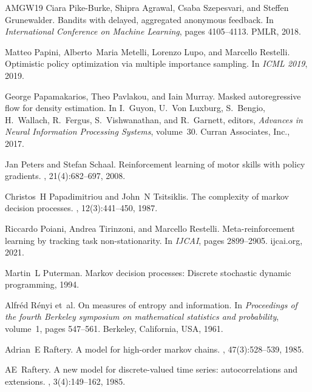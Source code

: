 \begin{thebibliography}{AMGW{\etalchar{+}}19}
Ciara Pike-Burke, Shipra Agrawal, Csaba Szepesvari, and Steffen Grunewalder.
\newblock Bandits with delayed, aggregated anonymous feedback.
\newblock In {\em International Conference on Machine Learning}, pages 4105--4113. PMLR, 2018.

Matteo Papini, Alberto~Maria Metelli, Lorenzo Lupo, and Marcello Restelli.
\newblock Optimistic policy optimization via multiple importance sampling.
\newblock In {\em ICML 2019}, 2019.

George Papamakarios, Theo Pavlakou, and Iain Murray.
\newblock Masked autoregressive flow for density estimation.
\newblock In I.~Guyon, U.~Von Luxburg, S.~Bengio, H.~Wallach, R.~Fergus, S.~Vishwanathan, and R.~Garnett, editors, {\em Advances in Neural Information Processing Systems}, volume~30. Curran Associates, Inc., 2017.

Jan Peters and Stefan Schaal.
\newblock Reinforcement learning of motor skills with policy gradients.
, 21(4):682--697, 2008.

Christos~H Papadimitriou and John~N Tsitsiklis.
\newblock The complexity of markov decision processes.
, 12(3):441--450, 1987.

Riccardo Poiani, Andrea Tirinzoni, and Marcello Restelli.
\newblock Meta-reinforcement learning by tracking task non-stationarity.
\newblock In {\em {IJCAI}}, pages 2899--2905. ijcai.org, 2021.

Martin~L Puterman.
\newblock Markov decision processes: Discrete stochastic dynamic programming, 1994.

Alfr{\'e}d R{\'e}nyi et~al.
\newblock On measures of entropy and information.
\newblock In {\em Proceedings of the fourth Berkeley symposium on mathematical statistics and probability}, volume~1, pages 547--561. Berkeley, California, USA, 1961.

Adrian~E Raftery.
\newblock A model for high-order markov chains.
, 47(3):528--539, 1985.

AE~Raftery.
\newblock A new model for discrete-valued time series: autocorrelations and extensions.
, 3(4):149--162, 1985.


\end{thebibliography}
